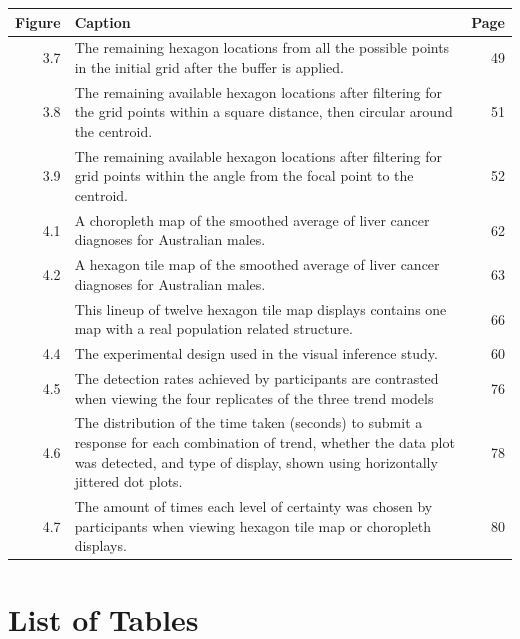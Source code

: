 \documentclass{monashthesis}
\begin{document}
\begin{tabular}{r>{\raggedright\arraybackslash}p{30em}r}
\toprule
Figure & Caption & Page\\
\midrule
3.7 & The remaining hexagon locations from all the possible points in the initial grid after the buffer is applied. & 49\\
3.8 & The remaining available hexagon locations after filtering for the grid points within a square distance, then circular around the centroid. & 51\\
3.9 & The remaining available hexagon locations after filtering for grid points within the angle from the focal point to the centroid. & 52\\
4.1 & A choropleth map of the smoothed average of liver cancer diagnoses for Australian males. & 62\\
4.2 & A hexagon tile map of the smoothed average of liver cancer diagnoses for Australian males. & 63\\
\addlinespace
4.3 & This lineup of twelve hexagon tile map displays contains one map with a real population related structure. & 66\\
4.4 & The experimental design used in the visual inference study. & 60\\
4.5 & The detection rates achieved by participants are contrasted when viewing the four replicates of the three trend models & 76\\
4.6 & The distribution of the time taken (seconds) to submit a response for each combination of trend, whether the data plot was detected, and type of display, shown using horizontally jittered dot plots. & 78\\
4.7 & The amount of times each level of certainty was chosen by participants when viewing hexagon tile map or choropleth displays. & 80\\
\bottomrule
\end{tabular}

\hypertarget{list-of-tables}{%
\chapter*{List of Tables}\label{list-of-tables}}
\end{document}
